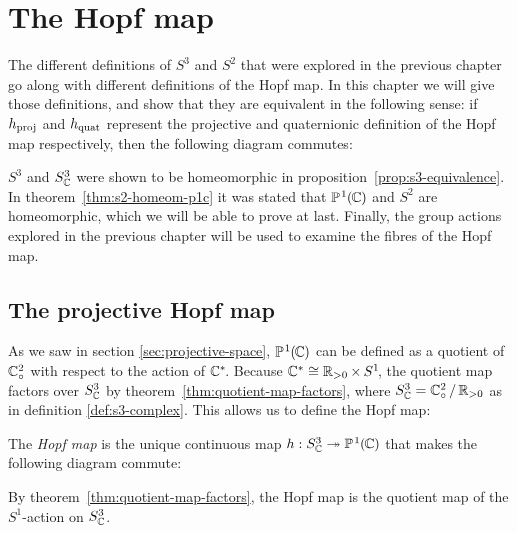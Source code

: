 
\chapter{The Hopf map}
\label{chap:the-hopf-map}
\newcommand*{\hquat}{h_\textup{quat}}
\newcommand*{\hproj}{h_\textup{proj}}
The different definitions of $S^3$ and $S^2$ that were explored in the previous chapter
go along with different definitions of the Hopf map.
In this chapter we will give those definitions,
and show that they are equivalent in the following sense:
if $\hproj$ and $\hquat$ represent the projective and quaternionic definition of the Hopf map respectively,
then the following diagram commutes:

\vspace{-\parskip}
\begin{center}
\end{center}

$S^3$ and $S^3_\C$ were shown to be homeomorphic in proposition~\ref{prop:s3-equivalence}.
In theorem~\ref{thm:s2-homeom-p1c} it was stated that $\PC$ and $S^2$ are homeomorphic,
which we will be able to prove at last.
Finally, the group actions explored in the previous chapter will be used to examine the fibres of the Hopf map.

\section{The projective Hopf map}
\label{sec:hopf-projective}
As we saw in section \ref{sec:projective-space},
$\PC$ can be defined as a quotient of $\CZ$ with respect to the action of $\C^*\!$.
Because $\C^* \cong \Rpos \times S^1\!$,
the quotient map factors over $\SC$ by theorem~\ref{thm:quotient-map-factors},
where $\SC = \CZ \, / \, \Rpos$ as in definition \ref{def:s3-complex}.
This allows us to define the Hopf map:

The \emph{Hopf map} is the unique continuous map $h : \SC \surj \PC$
that makes the following diagram commute:
\begin{center}
\end{center}
By theorem~\ref{thm:quotient-map-factors},
the Hopf map is the quotient map of the $S^1$-action on $\SC$.


